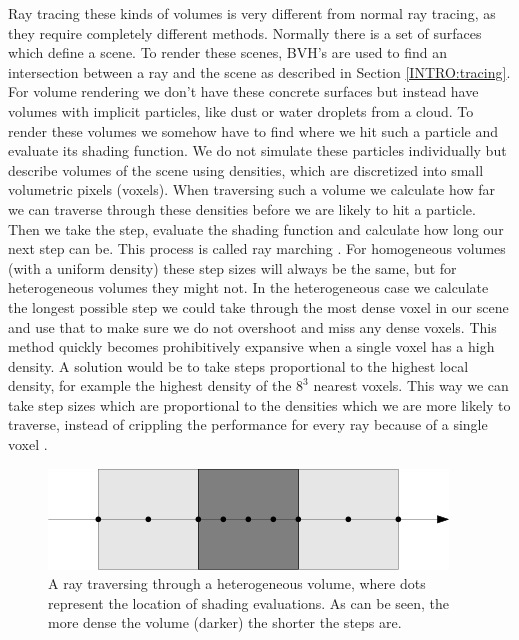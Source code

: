 Ray tracing these kinds of volumes is very different from normal ray tracing, as they require completely different methods. Normally there is a set of surfaces which define a scene. To render these scenes, BVH's are used to find an intersection between a ray and the scene as described in Section \ref{INTRO:tracing}. For volume rendering we don't have these concrete surfaces but instead have volumes with implicit particles, like dust or water droplets from a cloud. To render these volumes we somehow have to find where we hit such a particle and evaluate its shading function. We do not simulate these particles individually but describe volumes of the scene using densities, which are discretized into small volumetric pixels (voxels). When traversing such a volume we calculate how far we can traverse through these densities before we are likely to hit a particle. Then we take the step, evaluate the shading function and calculate how long our next step can be. This process is called ray marching \cite{RenderingWithTwoTriangles}. For homogeneous volumes (with a uniform density) these step sizes will always be the same, but for heterogeneous volumes they might not. In the heterogeneous case we calculate the longest possible step we could take through the most dense voxel in our scene and use that to make sure we do not overshoot and miss any dense voxels. This method quickly becomes prohibitively expansive when a single voxel has a high density. A solution would be to take steps proportional to the highest local density, for example the highest density of the $8^3$ nearest voxels. This way we can take step sizes which are proportional to the densities which we are more likely to traverse, instead of crippling the performance for every ray because of a single voxel \cite{kutz2017spectral}.

\begin{figure}[H]
    \centering
    \includegraphics[width=0.9\linewidth]{figures/sample_step_size.png}
    \caption{A ray traversing through a heterogeneous volume, where dots represent the location of shading evaluations. As can be seen, the more dense the volume (darker) the shorter the steps are.}
    \label{fig:sample_step_size}
\end{figure}

